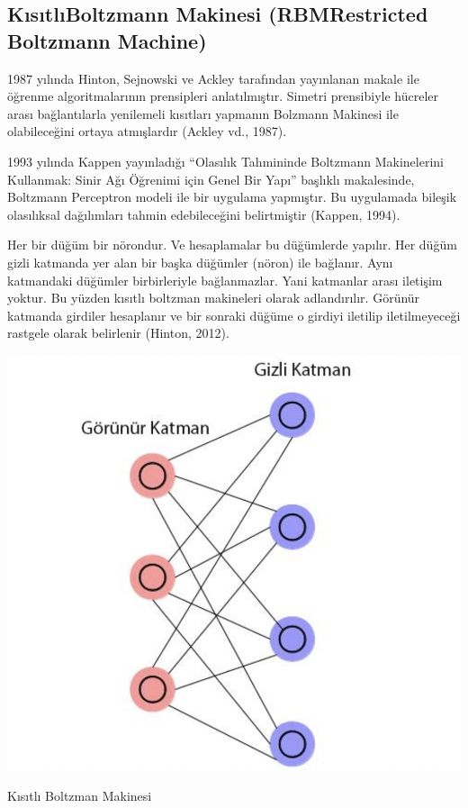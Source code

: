 \documentclass{article}
\begin{document}
\begin{multicols}{2}
\subsection{KısıtlıBoltzmann Makinesi (RBMRestricted Boltzmann Machine)}

1987 yılında Hinton, Sejnowski ve Ackley
tarafından yayınlanan makale ile öğrenme
algoritmalarının prensipleri anlatılmıştır. Simetri
prensibiyle hücreler arası bağlantılarla
yenilemeli kısıtları yapmanın Bolzmann Makinesi ile olabileceğini ortaya atmışlardır
(Ackley vd., 1987). 

1993 yılında Kappen yayınladığı “Olasılık
Tahmininde Boltzmann Makinelerini
Kullanmak: Sinir Ağı Öğrenimi için Genel Bir
Yapı” başlıklı makalesinde, Boltzmann
Perceptron modeli ile bir uygulama yapmıştır. Bu
uygulamada bileşik olasılıksal dağılımları
tahmin edebileceğini belirtmiştir (Kappen,
1994). 

Her bir düğüm bir nörondur. Ve hesaplamalar bu
düğümlerde yapılır. Her düğüm gizli katmanda
yer alan bir başka düğümler (nöron) ile bağlanır.
Aynı katmandaki düğümler birbirleriyle
bağlanmazlar. Yani katmanlar arası iletişim
yoktur. Bu yüzden kısıtlı boltzman makineleri
olarak adlandırılır. Görünür katmanda girdiler
hesaplanır ve bir sonraki düğüme o girdiyi iletilip
iletilmeyeceği rastgele olarak belirlenir (Hinton,
2012). 

\vspace{10pt}
\begin{minipage}{\linewidth}
    \includegraphics[width=0.8\linewidth]{gorunurkat.png} 
    \label{fig:Şekil 7}
\end{minipage}
\begin{center}
    Kısıtlı Boltzman Makinesi \cite{ref3}
\end{center}
\end{multicols}
\end{document}
